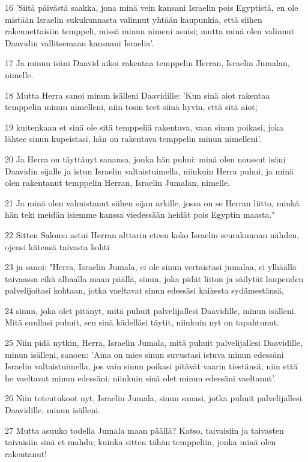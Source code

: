 \par 16 'Siitä päivästä saakka, jona minä vein kansani Israelin pois Egyptistä, en ole mistään Israelin sukukunnasta valinnut yhtään kaupunkia, että siihen rakennettaisiin temppeli, missä minun nimeni asuisi; mutta minä olen valinnut Daavidin vallitsemaan kansaani Israelia'.
\par 17 Ja minun isäni Daavid aikoi rakentaa temppelin Herran, Israelin Jumalan, nimelle.
\par 18 Mutta Herra sanoi minun isälleni Daavidille: 'Kun sinä aiot rakentaa temppelin minun nimelleni, niin tosin teet siinä hyvin, että sitä aiot;
\par 19 kuitenkaan et sinä ole sitä temppeliä rakentava, vaan sinun poikasi, joka lähtee sinun kupeistasi, hän on rakentava temppelin minun nimelleni'.
\par 20 Ja Herra on täyttänyt sanansa, jonka hän puhui: minä olen noussut isäni Daavidin sijalle ja istun Israelin valtaistuimella, niinkuin Herra puhui, ja minä olen rakentanut temppelin Herran, Israelin Jumalan, nimelle.
\par 21 Ja minä olen valmistanut siihen sijan arkille, jossa on se Herran liitto, minkä hän teki meidän isiemme kanssa viedessään heidät pois Egyptin maasta."
\par 22 Sitten Salomo astui Herran alttarin eteen koko Israelin seurakunnan nähden, ojensi kätensä taivasta kohti
\par 23 ja sanoi: "Herra, Israelin Jumala, ei ole sinun vertaistasi jumalaa, ei ylhäällä taivaassa eikä alhaalla maan päällä, sinun, joka pidät liiton ja säilytät laupeuden palvelijoitasi kohtaan, jotka vaeltavat sinun edessäsi kaikesta sydämestänsä,
\par 24 sinun, joka olet pitänyt, mitä puhuit palvelijallesi Daavidille, minun isälleni. Mitä suullasi puhuit, sen sinä kädelläsi täytit, niinkuin nyt on tapahtunut.
\par 25 Niin pidä nytkin, Herra, Israelin Jumala, mitä puhuit palvelijallesi Daavidille, minun isälleni, sanoen: 'Aina on mies sinun suvustasi istuva minun edessäni Israelin valtaistuimella, jos vain sinun poikasi pitävät vaarin tiestänsä, niin että he vaeltavat minun edessäni, niinkuin sinä olet minun edessäni vaeltanut'.
\par 26 Niin toteutukoot nyt, Israelin Jumala, sinun sanasi, jotka puhuit palvelijallesi Daavidille, minun isälleni.
\par 27 Mutta asuuko todella Jumala maan päällä? Katso, taivaisiin ja taivasten taivaisiin sinä et mahdu; kuinka sitten tähän temppeliin, jonka minä olen rakentanut!
